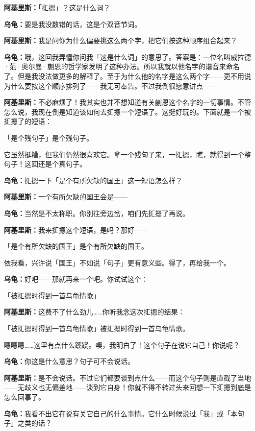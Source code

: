\documentclass[
  12pt,
  twoside,
  openright,
  oldfontcommands,
]{memoir}
\newcommand{\dialogname}[1]{{\heifamily\bfseries #1}}
\begin{document}
\dialogname{阿基里斯：}「㧟摁」？这是什么词？

\dialogname{乌龟：}要是我没数错的话，这是个双音节词。

\dialogname{阿基里斯：}我是问你为什么偏要挑这么两个字，把它们按这种顺序组合起来？

\dialogname{乌龟：}哦，这回我弄懂你问我「这是什么词」的意思了。答案是：一位名叫威拉德·范·奥尔曼·蒯恩的哲学家发明了这种办法。所以我就以他名字的谐音来命名了。但是我没法做更多的解释了。至于为什么他的名字是这么两个字------更不用说为什么要按这个顺序排列了------我无可奉告。不过我倒很愿意讲点------

\dialogname{阿基里斯：}不必麻烦了！我其实也并不想知道有关蒯恩这个名字的一切事情。不管怎么说，我现在倒是知道该如何去㧟摁一个短语了。这挺好玩的。下面就是一个被㧟摁了的短语：

「是个残句子」是个残句子。

它虽然挺糟，但我们仍然很喜欢它。拿一个残句子来，一㧟摁，瞧，就得到一个整句子！这回还是个真句子。

\dialogname{乌龟：}㧟摁一下「是个有所欠缺的国王」这一短语怎么样？

\dialogname{阿基里斯：}一个有所欠缺的国王会是------

\dialogname{乌龟：}当然是不太称职。你别往旁边岔，咱们先㧟摁了再说。

\dialogname{阿基里斯：}我来㧟摁这个短语，是吗？那好------

「是个有所欠缺的国王」是个有所欠缺的国王。

依我看，兴许说「国王」不如说「句子」更有意义些。得了，再给我一个。

\dialogname{乌龟：}好吧------那就再来一个吧。你试试这个：

「被㧟摁时得到一首乌龟情歌」

\dialogname{阿基里斯：}这费不了什么劲儿\ldots\ldots 你听我念这次㧟摁的结果：

「被㧟摁时得到一首乌龟情歌」被㧟摁时得到一首乌龟情歌。

嗯嗯嗯\ldots\ldots 这里有点什么蹊跷。噢，我明白了！这个句子在说它自己！你说呢？

\dialogname{乌龟：}你这是什么意思？句子可不会说话。

\dialogname{阿基里斯：}是不会说话。不过它们都要谈到点什么------而这个句子则是直截了当地------无歧义也无偏差地------谈到它自身！你就不得不转过头来回想一下㧟摁到底是怎么回事了。

\dialogname{乌龟：}我看不出它在说有关它自己的什么事情。它什么时候说过「我」或「本句子」之类的话？
\end{document}
